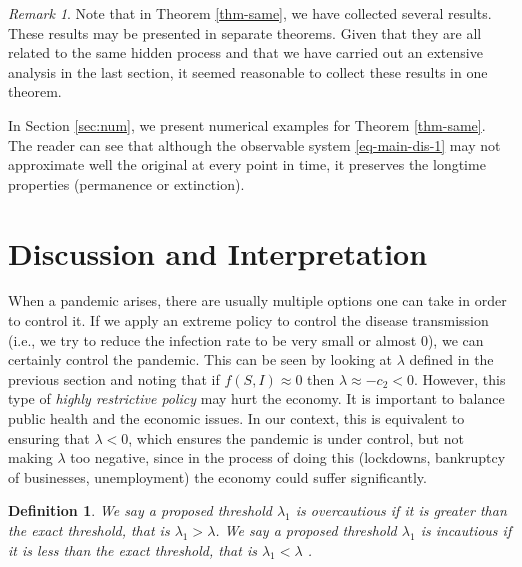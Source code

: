 \documentclass[12pt]{amsart}
\newtheorem{thm}{Theorem}[section]
\newtheorem{deff}{Definition}[section]
\theoremstyle{remark}
\newtheorem{rem}{Remark}
\numberwithin{equation}{section}
\numberwithin{equation}{section}
\newcommand{\1}{\boldsymbol{1}}
\begin{document}
%

\begin{rem}
Note that in Theorem \ref{thm-same}, we have collected several results. These results may be presented in separate theorems. Given that they are all related to the same hidden process
and that we have carried out an extensive analysis in the last section, it seemed reasonable to collect these results in one theorem.

	In Section \ref{sec:num}, we  present numerical examples for Theorem \ref{thm-same}. The reader can see that although the observable system \eqref{eq-main-dis-1} may not approximate well the original at every point in time, it preserves the longtime properties (permanence or extinction).
\end{rem}

\newcommand{\pre}{{\rm\tiny pre}}
\section{Discussion and Interpretation}\label{sec:disc}
When a pandemic arises, there are usually multiple options one can take in order to  control it. If we apply an extreme policy to control the disease transmission (i.e., we try to reduce the infection rate to be very small or almost $0$), we can certainly control the pandemic.
This can be seen
by looking at $\lambda$ defined in the previous section and noting that if $f(S,I)\approx 0$ then $\lambda\approx -c_2<0$.
However, this type of \textit{highly restrictive policy} may hurt the economy.
It is
important
to
balance public health and the economic issues.
In our context, this is equivalent to ensuring that $\lambda<0$, which ensures the pandemic is under control, but not making $\lambda$ too negative, since in the process of doing this (lockdowns, bankruptcy of businesses, unemployment) the economy could suffer significantly.

\begin{deff}
	We say a proposed threshold $\lambda_1$ is overcautious if it is greater than the exact threshold, that is $\lambda_1>\lambda$.
	We say a proposed threshold $\lambda_1$ is incautious if it is less than the exact threshold, that is $\lambda_1<\lambda$ .
\end{deff}
\end{document}
